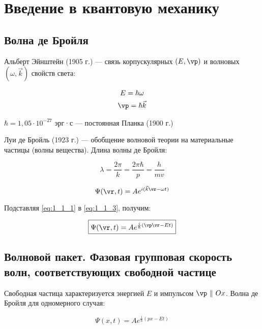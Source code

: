 \chapter{Введение в квантовую механику}

\section{Волна де Бройля}

Альберт Эйнштейн (1905 г.) --- связь корпускулярных $(E, \vp)$ и волновых $(\omega, \vec{k})$ свойств света:

\begin{equation}
\label{eq:1_1_1}
\begin{gathered}
E = \hbar \omega \\ 
\vp = \hbar \vec{k}
\end{gathered}
\end{equation}

$\hbar = 1{,}05 \cdot 10^{-27}$ эрг·с --- постоянная Планка (1900 г.)

Луи де Бройль (1923 г.) --- обобщение волновой теории на материальные частицы (волны вещества). Длина волны де Бройля:

\begin{equation}
\label{eq:1_1_2}
\lambda = \frac{2\pi}{k} = \frac{2\pi \hbar}{p} = \frac{h}{mv}
\end{equation}

\begin{equation}
\label{eq:1_1_3}
\Psi (\vr, t) = A e^{i(\vec{k}\vr - \omega t)}
\end{equation}

Подставляя \eqref{eq:1_1_1} в \eqref{eq:1_1_3}, получим:

\begin{equation}
\label{eq:1_1_4}
\boxed{\Psi(\vr,t) = A e^{\frac{i}{\hbar}(\vp\vr - Et)}}
\end{equation}

\section{Волновой пакет. Фазовая  групповая скорость волн, соответствующих свободной частице}

Свободная частица характеризуется энергией $E$ и импульсом $\vp~ \|~ Ox$. Волна де Бройля для одномерного случая:

\begin{equation}
\label{eq:1_2_1}
\Psi(x,t) = A e^{\frac{i}{\hbar}(px - Et)}
\end{equation}

